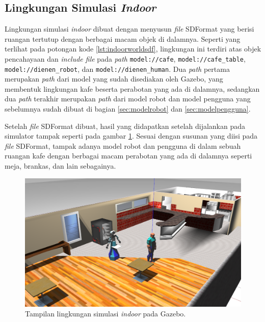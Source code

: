 \subsection{Lingkungan Simulasi \emph{Indoor}}
\label{subsec:lingkunganindoor}

Lingkungan simulasi \emph{indoor} dibuat dengan menyusun \emph{file} SDFormat yang berisi ruangan tertutup dengan berbagai macam objek di dalamnya.
Seperti yang terlihat pada potongan kode \ref{lst:indoorworldsdf},
  lingkungan ini terdiri atas objek pencahayaan dan \emph{include file} pada \emph{path} \lstinline{model://cafe}, \lstinline{model://cafe_table}, \lstinline{model://dienen_robot}, dan \lstinline{model://dienen_human}.
Dua \emph{path} pertama merupakan \emph{path} dari model yang sudah disediakan oleh Gazebo,
  yang membentuk lingkungan kafe beserta perabotan yang ada di dalamnya,
  sedangkan dua \emph{path} terakhir merupakan \emph{path} dari model robot dan model pengguna yang sebelumnya sudah dibuat di bagian \ref{sec:modelrobot} dan \ref{sec:modelpengguna}.



Setelah \emph{file} SDFormat dibuat,
  hasil yang didapatkan setelah dijalankan pada simulator tampak seperti pada gambar \ref{fig:lingkunganindoor}.
Sesuai dengan susunan yang diisi pada \emph{file} SDFormat,
  tampak adanya model robot dan pengguna di dalam sebuah ruangan kafe dengan berbagai macam perabotan yang ada di dalamnya seperti meja, brankas, dan lain sebagainya.

\begin{figure} [ht]
  \centering
  \includegraphics[scale=0.23]{gambar/lingkungan-indoor.png}
  \caption{Tampilan lingkungan simulasi \emph{indoor} pada Gazebo.}
  \label{fig:lingkunganindoor}
\end{figure}
